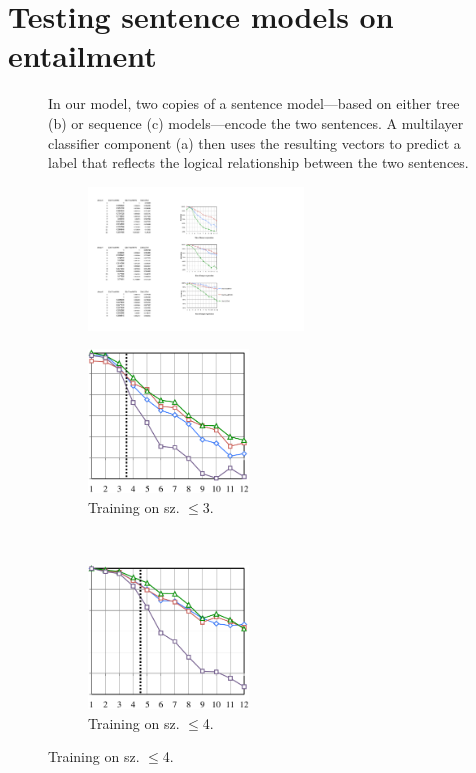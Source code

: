 \section{Testing sentence models on entailment} \label{methods}

\begin{figure}[t]
  \centering
  
  \caption{In our model, two copies of a sentence model---based on either tree (b) or sequence (c) models---encode the two sentences. A multilayer classifier component (a) then uses the resulting vectors to predict a label that reflects the logical relationship between the two sentences.}
  \label{sample-figure}
\end{figure}

\begin{figure}[t]
  \centering
  \begin{subfigure}[t]{0.04\textwidth}
      \includegraphics[height=1.5in]{scale.pdf}
\end{subfigure}
\begin{subfigure}[t]{0.24\textwidth}
  \includegraphics[height=1.5in]{fig3c.pdf}
  \caption{Training on sz. $\le$3.}
  \end{subfigure}~~~~
\begin{subfigure}[t]{0.24\textwidth}
    \includegraphics[height=1.5in]{fig4c.pdf}
  \caption{Training on sz. $\le$4.}

\end{subfigure}
\end{figure}
